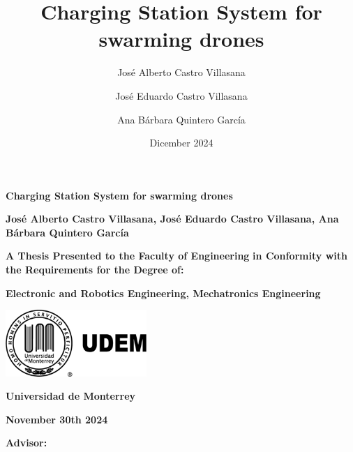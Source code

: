 \documentclass[11pt]{report} %
\title{Charging Station System for swarming drones} %
\author{José Alberto Castro Villasana \and José Eduardo Castro Villasana \and Ana Bárbara Quintero García} %
\date{Dicember 2024} %
\begin{document}
\begin{titlepage}
    \centering
    \vspace*{1cm}
    
    {\Huge\textbf{Charging Station System for swarming drones}} %
    
    \vspace{2.5cm} %
    {\Large\textbf{José Alberto Castro Villasana, José Eduardo Castro Villasana, Ana Bárbara Quintero García}} %
    
    \vfill
    
    {\large\textbf{A Thesis Presented to the Faculty of Engineering}} %
    {\large\textbf{in Conformity with the Requirements for the Degree of:}} %

    \vspace{0.2cm}
    {\large\textbf{Electronic and Robotics Engineering, Mechatronics Engineering}} %

    \vspace{2cm}
    
    \includegraphics[width=0.4\textwidth]{pictures/logo_udem.png} %
    
    \vspace{2cm}
    
    {\large\textbf{Universidad de Monterrey}}

    \vspace{0.2cm}
    {\large{}} 

    \vspace{0.2cm}
    {\large{}} %
    
    \vspace{1.5cm}
    {\large\textbf{November 30th 2024}} %
    
    \vfill
    {\large\textbf{Advisor:} } %
    
\end{titlepage}
\end{document}
